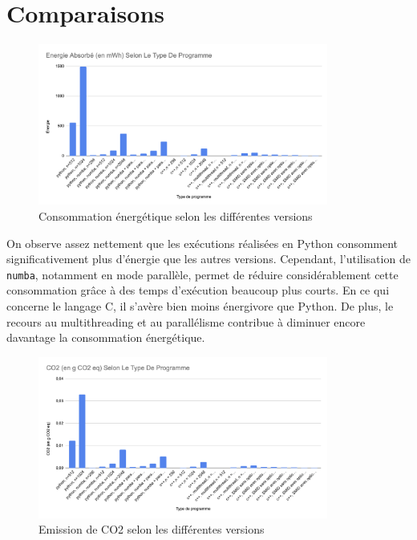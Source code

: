 \section{Comparaisons}
\begin{figure}[H]
    \centering
    \includegraphics[width=0.85\textwidth]{images/graph1.png}
    \caption{Consommation énergétique selon les différentes versions}
\end{figure}

On observe assez nettement que les exécutions réalisées en Python consomment significativement plus d’énergie que les autres versions.  
Cependant, l’utilisation de \texttt{numba}, notamment en mode parallèle, permet de réduire considérablement cette consommation grâce à des temps d’exécution beaucoup plus courts.  
En ce qui concerne le langage C, il s’avère bien moins énergivore que Python. De plus, le recours au multithreading et au parallélisme contribue à diminuer encore davantage la consommation énergétique.
 


\begin{figure}[H]
    \centering
    \includegraphics[width=0.85\textwidth]{images/graph2.png}
    \caption{Emission de CO2 selon les différentes versions}
\end{figure}

